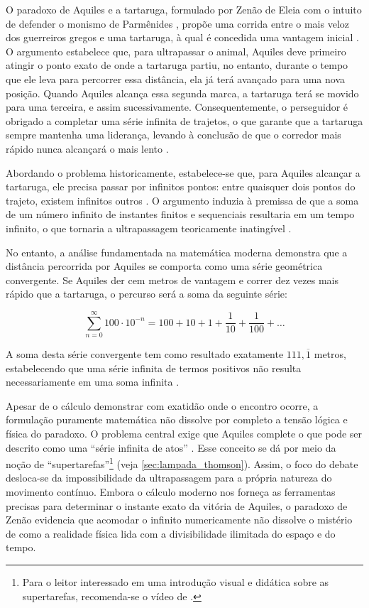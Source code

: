 O paradoxo de Aquiles e a tartaruga, formulado por Zenão de Eleia com o intuito de defender o monismo de Parmênides \parencite[p.~137]{vlastos1975}, propõe uma corrida entre o mais veloz dos guerreiros gregos e uma tartaruga, à qual é concedida uma vantagem inicial \parencite[p.~9]{salmon2001}. O argumento estabelece que, para ultrapassar o animal, Aquiles deve primeiro atingir o ponto exato de onde a tartaruga partiu, no entanto, durante o tempo que ele leva para percorrer essa distância, ela já terá avançado para uma nova posição. Quando Aquiles alcança essa segunda marca, a tartaruga terá se movido para uma terceira, e assim sucessivamente. Consequentemente, o perseguidor é obrigado a completar uma série infinita de trajetos, o que garante que a tartaruga sempre mantenha uma liderança, levando à conclusão de que o corredor mais rápido nunca alcançará o mais lento \parencite[p.~67]{salmon2001}.


Abordando o problema historicamente, estabelece-se que, para Aquiles alcançar a tartaruga, ele precisa passar por infinitos pontos: entre quaisquer dois pontos do trajeto, existem infinitos outros \parencite[p.~48]{salmon2001}. O argumento induzia à premissa de que a soma de um número infinito de instantes finitos e sequenciais resultaria em um tempo infinito, o que tornaria a ultrapassagem teoricamente inatingível \parencite[p.~49]{salmon2001}.

No entanto, a análise fundamentada na matemática moderna demonstra que a distância percorrida por Aquiles se comporta como uma série geométrica convergente. Se Aquiles der cem metros de vantagem e correr dez vezes mais rápido que a tartaruga, o percurso será a soma da seguinte série:

\[\sum_{n=0}^{\infty} 100 \cdot 10^{-n} = 100 + 10 + 1 + \frac{1}{10} + \frac{1}{100} + \dots \]

A soma desta série convergente tem como resultado exatamente \(111,\overline{1}\) metros, estabelecendo que uma série infinita de termos positivos não resulta necessariamente em uma soma infinita \parencite[p.~68]{salmon2001}.

Apesar de o cálculo demonstrar com exatidão onde o encontro ocorre, a formulação puramente matemática não dissolve por completo a tensão lógica e física do paradoxo. O problema central exige que Aquiles complete o que pode ser descrito como uma ``série infinita de atos'' \parencite[p.~71]{salmon2001}. Esse conceito se dá por meio da noção de ``supertarefas''\footnote{Para o leitor interessado em uma introdução visual e didática sobre as supertarefas, recomenda-se o vídeo de \textcite{vsauce2015}.} (veja \autoref{sec:lampada_thomson}). Assim, o foco do debate desloca-se da impossibilidade da ultrapassagem para a própria natureza do movimento contínuo. Embora o cálculo moderno nos forneça as ferramentas precisas para determinar o instante exato da vitória de Aquiles, o paradoxo de Zenão evidencia que acomodar o infinito numericamente não dissolve o mistério de como a realidade física lida com a divisibilidade ilimitada do espaço e do tempo.

